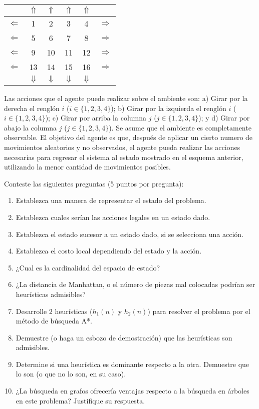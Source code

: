 \documentclass[onecolumn, letter, 12pt]{article}
\begin{document}
\begin{center}
\begin{tabular}{c|c|c|c|c|c}
           & $\Uparrow$& $\Uparrow$& $\Uparrow$& $\Uparrow$&            \\
\hline
$\Leftarrow$ &     1     &     2     &     3     &      4    & $\Rightarrow$ \\
\hline
$\Leftarrow$ &     5     &     6     &     7     &      8    & $\Rightarrow$ \\
\hline
$\Leftarrow$ &     9     &    10     &    11     &     12    & $\Rightarrow$ \\
\hline
$\Leftarrow$ &    13     &    14     &    15     &     16    & $\Rightarrow$ \\
\hline
            & $\Downarrow$ & $\Downarrow$ & $\Downarrow$ & $\Downarrow$ &  \\
\end{tabular}
\end{center}

Las acciones que el agente puede realizar sobre el ambiente son: a) Girar por la derecha
el renglón $i$ ($i \in \{1,2,3,4\}$); b) Girar por la izquierda el renglón $i$ ($i \in
\{1,2,3,4\}$); c) Girar por arriba la columna $j$ ($j \in \{1,2,3,4\}$); y d) Girar por
abajo la columna $j$ ($j \in \{1,2,3,4\}$). Se asume que el ambiente es completamente
observable. El objetivo del agente es que, después de aplicar un cierto numero de movimientos aleatorios
y no observados, el agente pueda realizar las acciones necesarias para regresar el sistema
al estado mostrado en el esquema anterior, utilizando la menor cantidad de movimientos
posibles.

Conteste las siguientes preguntas (5 puntos por pregunta):

\begin{enumerate}
\item Establezca una manera de representar el estado del problema.
\item Establezca cuales serían las acciones legales en un estado dado.
\item Establezca el estado sucesor a un estado dado, si se selecciona una acción.
\item Establezca el costo local dependiendo del estado y la acción. 
\item ¿Cual es la cardinalidad del espacio de estado?
\item ¿La distancia de Manhattan, o el número de piezas mal colocadas podrían ser
  heurísticas admisibles?
\item Desarrolle 2 heurísticas ($h_1(n)$ y $h_2(n)$) para resolver el problema por el método de búsqueda A*. 
\item Demuestre (o haga un esbozo de demostración) que las heurísticas son admisibles. 
\item Determine si una heurística es dominante respecto a la otra. Demuestre que lo son (o que no lo son, en su caso).
\item ¿La búsqueda en grafos ofrecería ventajas respecto a la búsqueda en árboles en este problema? Justifique su respuesta.
\end{enumerate}
\end{document}
